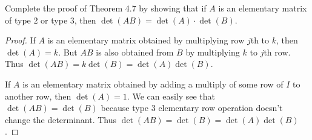 \documentclass[12pt, a4paper]{article}
\theoremstyle{plain}
\begin{document}
\begin{exercise}{18}
Complete the proof of Theorem 4.7 by showing that if $A$ is an elementary matrix of type $2$ or type $3$, then $\det(AB)=\det(A)\cdot \det(B)$.
\end{exercise}
	\begin{proof}
	If $A$ is an elementary matrix obtained by multiplying row $j$th to $k$, then $\det(A)=k$. But $AB$ is also obtained from $B$ by multiplying $k$ to $j$th row. Thus $\det(AB)=k\det(B)=\det(A)\det(B)$.
	
	If $A$ is an elementary matrix obtained by adding a multiply of some row of $I$ to another row, then $\det(A)=1$. We can easily see that $\det(AB)=\det(B)$ because type 3 elementary row operation doesn't change the determinant. Thus $\det(AB)=\det(B)=\det(A)\det(B)$.
	\end{proof}
	
\pagebreak
\end{document}
